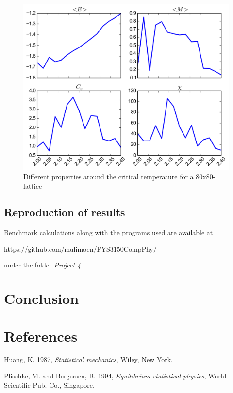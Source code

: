 \documentclass[11pt,a4paper,english]{article}
\numberwithin{equation}{section}
\newcommand{\figurewidth}{.85\textwidth}
\begin{document}
\begin{figure}
\centering
\includegraphics[width=\figurewidth]{pics/pics4report/e80.png}
\caption{Different properties around the critical temperature for 
a 80x80-lattice}
\label{fig:e80}
\end{figure}



\subsection{Reproduction of results}

Benchmark calculations along with the programs used are available at

\url{https://github.com/mulimoen/FYS3150CompPhy/}

under the folder \emph{Project 4}.

\section{Conclusion}

\section{References}
Huang, K. 1987, \emph{Statistical mechanics}, Wiley, New York. 

Plischke, M. and Bergersen, B. 1994, \emph{Equilibrium statistical physics}, World Scientific Pub. Co., Singapore.
\end{document}
